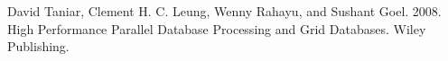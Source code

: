 \documentclass{beamer}
\begin{document}
\begin{frame}[allowframebreaks]
{\begin{thebibliography}{99}



 David Taniar, Clement H. C. Leung, Wenny Rahayu, and Sushant Goel. 2008. High Performance Parallel Database Processing and Grid Databases. Wiley Publishing. 


\end{thebibliography}
}
\end{frame}
\end{document}
